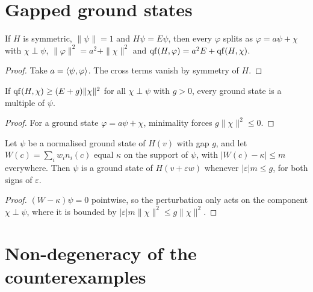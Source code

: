 \section{Gapped ground states}

\begin{lemma}
  \label{lem:decomp}
  \leanok
  If $H$ is symmetric, $\|\psi\|=1$ and $H\psi=E\psi$, then every $\varphi$ splits as
  $\varphi=a\psi+\chi$ with $\chi\perp\psi$, $\|\varphi\|^2=a^2+\|\chi\|^2$ and
  $\operatorname{qf}(H,\varphi)=a^2E+\operatorname{qf}(H,\chi)$.
\end{lemma}
\begin{proof}
  \leanok
  Take $a=\langle \psi, \varphi\rangle$. The cross terms vanish by symmetry of $H$.
\end{proof}

\begin{theorem}
  \label{thm:unique_of_gap}
  \leanok
  If $\operatorname{qf}(H,\chi)\ge(E+g)\|\chi\|^2$ for all $\chi\perp\psi$ with $g>0$, every ground state is a multiple of
  $\psi$.
\end{theorem}
\begin{proof}
  \leanok
  For a ground state $\varphi=a\psi+\chi$, minimality forces $g\|\chi\|^2\le0$.
\end{proof}

\begin{theorem}
  \label{thm:persist_of_gap}
  \leanok
  Let $\psi$ be a normalised ground state of $H(v)$ with gap $g$, and let $W(c)=\sum_iw_in_i(c)$ equal
  $\kappa$ on the support of $\psi$, with $|W(c)-\kappa|\le m$ everywhere. Then $\psi$ is a ground state of
  $H(v+\varepsilon w)$ whenever $|\varepsilon|m\le g$, for both signs of $\varepsilon$.
\end{theorem}
\begin{proof}
  \leanok
  $(W-\kappa)\psi=0$ pointwise, so the perturbation only acts on the component $\chi\perp\psi$, where it is
  bounded by $|\varepsilon|m\|\chi\|^2\le g\|\chi\|^2$.
\end{proof}

\section{Non-degeneracy of the counterexamples}

